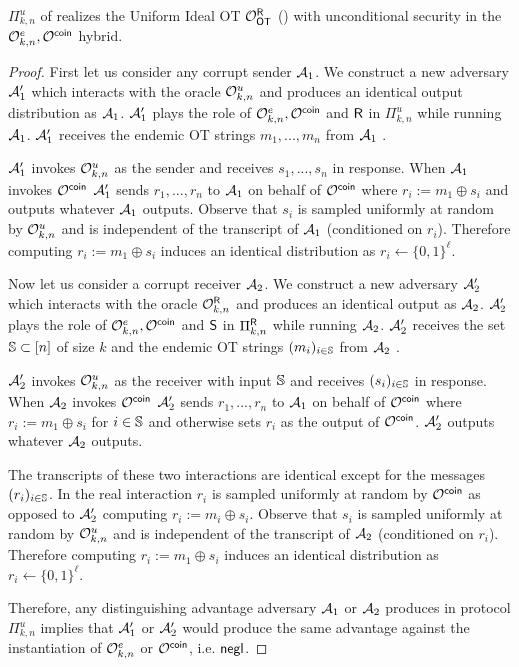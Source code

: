 \begin{lemma}
	$\Pi^{u}_{k,n}$ of  realizes the Uniform Ideal OT $\mathcal{O}_{\mathsf{OT}}^{\mathsf{R}}$ () with unconditional security in the $\mathcal{O}^{e}_{k,n},\mathcal{O}^{\mathsf{coin}}$ hybrid.
\end{lemma}
\begin{proof}
	First let us consider any corrupt sender $\mathcal{A}_1$. We construct a new adversary $\mathcal{A}_1'$ which interacts with the oracle $\mathcal{O}^{u}_{k,n}$ and produces an identical output distribution as $\mathcal{A}_1$.  $\mathcal{A}_1'$ plays the role of $\mathcal{O}^{e}_{k,n},\mathcal{O}^{\mathsf{coin}}$ and $\mathsf{R}$ in $\Pi^{u}_{k,n}$ while running $\mathcal{A}_1$. $\mathcal{A}_1'$ receives the endemic OT strings $m_1,...,m_n$ from $\mathcal{A}_1$%
.
	
	
	$\mathcal{A}_1'$ invokes $\mathcal{O}^{u}_{k,n}$ as the sender and receives $s_1,...,s_n$ in response. When $\mathcal{A}_1$ invokes $\mathcal{O}^{\mathsf{coin}}$%
 $\mathcal{A}_1'$ sends $r_1,...,r_n$ to $\mathcal{A}_1$ on behalf of $\mathcal{O}^{\mathsf{coin}}$ where $r_i:=m_1\oplus s_i$ and outputs whatever $\mathcal{A}_1$ outputs. Observe that $s_i$ is sampled uniformly at random by $\mathcal{O}^{u}_{k,n}$ and is independent of the transcript of $\mathcal{A}_1$ (conditioned on $r_i$). Therefore computing $r_i:=m_1\oplus s_i$ induces an identical distribution as $r_i\gets\{0,1\}^\ell$.
	
	Now let us consider a corrupt receiver $\mathcal{A}_2$. We construct a new adversary $\mathcal{A}_2'$ which interacts with the oracle $\mathcal{O}^{\mathsf{R}}_{k,n}$ and produces an identical output as $\mathcal{A}_2$. $\mathcal{A}_2'$ plays the role of $\mathcal{O}^{e}_{k,n},\mathcal{O}^{\mathsf{coin}}$ and $\mathsf{S}$ in $\Pi^{\mathsf{R}}_{k,n}$ while running $\mathcal{A}_2$. $\mathcal{A}_2'$ receives the set $\mathsf{\mathbb S}\subset[n]$ of size $k$ and the endemic OT strings $(m_i)_{i\in \mathsf{\mathbb S}}$ from $\mathcal{A}_2$%
. 
	
	
	$\mathcal{A}_2'$ invokes  $\mathcal{O}^{u}_{k,n}$ as the receiver with input $\mathsf{\mathbb S}$ and receives $(s_i)_{i\in\mathsf{\mathbb S}}$ in response. When $\mathcal{A}_2$ invokes $\mathcal{O}^{\mathsf{coin}}$%
	$\mathcal{A}_2'$ sends $r_1,...,r_n$ to $\mathcal{A}_1$ on behalf of $\mathcal{O}^{\mathsf{coin}}$ where $r_i:=m_1\oplus s_i$ for $i\in \mathsf{\mathbb S}$ and otherwise sets $r_i$ as the output of $\mathcal{O}^\mathsf{coin}$. $\mathcal{A}_2'$ outputs whatever $\mathcal{A}_2$ outputs.
	
	The transcripts of these two interactions are identical except for the messages $(r_i)_{i\in \mathsf{\mathbb S}}$. In the real interaction $r_i$ is sampled uniformly at random by $\mathcal{O}^{\mathsf{coin}}$ as opposed to $\mathcal{A}_2'$ computing $r_i:=m_i\oplus s_i$. Observe that $s_i$ is sampled uniformly at random by $\mathcal{O}^{u}_{k,n}$ and is independent of the transcript of $\mathcal{A}_2$ (conditioned on $r_i$). Therefore computing $r_i:=m_1\oplus s_i$ induces an identical distribution as $r_i\gets\{0,1\}^\ell$.

	Therefore, any distinguishing advantage adversary $\mathcal{A}_1$ or $\mathcal{A}_2$ produces in protocol $\Pi^{u}_{k,n}$ implies that $\mathcal{A}_1'$ or $\mathcal{A}_2'$ would produce the same advantage against the instantiation of $\mathcal{O}^{e}_{k,n}$ or $\mathcal{O}^\mathsf{coin}$, i.e. $\mathsf{negl}$.
	
\end{proof}
